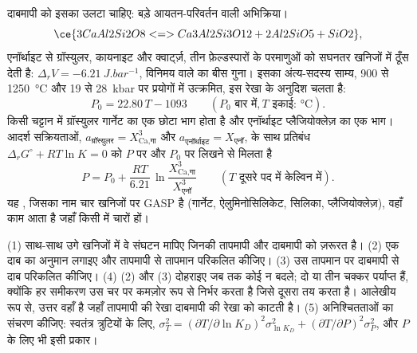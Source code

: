 दाबमापी को इसका उलटा चाहिए: बड़े आयतन-परिवर्तन वाली अभिक्रिया। 
\[
\ce{3 CaAl2Si2O8 <=> Ca3Al2Si3O12 + 2 Al2SiO5 + SiO2},
\]
एनॉर्थाइट से ग्रॉस्युलर, कायनाइट और क्वार्ट्ज़, तीन फ़ेल्डस्पारों के परमाणुओं को
सघनतर खनिजों में ठूँस देती है: $\Delta_r V = \qty{-6.21}{J.bar^{-1}}$, विनिमय वाले का बीस गुना।
इसका अंत्य-सदस्य साम्य, 900 से \qty{1250}{\celsius} और 19
से \qty{28}{kbar} पर प्रयोगों में उत्क्रमित, इस रेखा के अनुदिश चलता है:
\[
P_0 = 22.80\,T - 1093 \qquad (P_0 \text{ बार में}, T \text{ इकाई: } \unit{\celsius}).
\]
किसी चट्टान में ग्रॉस्युलर गार्नेट का एक छोटा भाग होता है और एनॉर्थाइट
प्लैजियोक्लेज़ का एक भाग। आदर्श सक्रियताओं, $a_{\text{ग्रॉस्युलर}} = X_{\text{Ca,गा}}^3$ और
$a_{\text{एनॉर्थाइट}} = X_{\text{एनॉ}}$, के साथ प्रतिबंध $\Delta_r G^\circ + RT\ln K = 0$
को $P$ पर और $P_0$ पर लिखने से मिलता है
\[
P = P_0 + \frac{RT}{6.21}\,\ln\frac{X_{\text{Ca,गा}}^3}{X_{\text{एनॉ}}^3}
\qquad (T \text{ दूसरे पद में केल्विन में}).
\]
यह , जिसका नाम चार खनिजों पर GASP है (गार्नेट, ऐलुमिनोसिलिकेट, सिलिका,
प्लैजियोक्लेज़), वहाँ काम आता है जहाँ किसी  में चारों हों।

\begin{method}[एक चट्टान का तापमान और दाब]\label{met:b2:pt-paths:intersection}
(1) साथ-साथ उगे खनिजों में वे संघटन मापिए जिनकी तापमापी और
दाबमापी को ज़रूरत है। (2) एक दाब का अनुमान लगाइए और तापमापी से तापमान परिकलित कीजिए।
(3) उस तापमान पर दाबमापी से दाब परिकलित कीजिए। (4) (2) और (3) दोहराइए
जब तक कोई न बदले; दो या तीन चक्कर पर्याप्त हैं, क्योंकि हर समीकरण उस चर पर कमज़ोर रूप से
निर्भर करता है जिसे दूसरा तय करता है। आलेखीय रूप से, उत्तर वहाँ है जहाँ
तापमापी की रेखा दाबमापी की रेखा को काटती है। (5) अनिश्चितताओं का संचरण कीजिए:
स्वतंत्र त्रुटियों के लिए, $\sigma_T^2 = (\partial T/\partial\ln K_D)^2\sigma_{\ln K_D}^2 +
(\partial T/\partial P)^2\sigma_P^2$, और $P$ के लिए भी इसी प्रकार।
\end{method}

